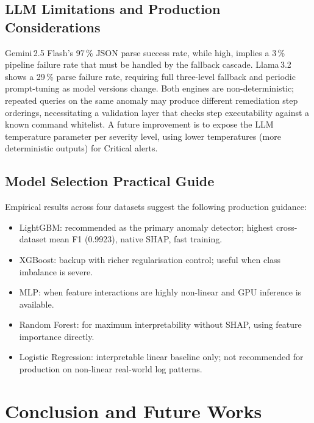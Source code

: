 \documentclass[5p, times]{elsarticle}
\begin{document}
\subsection{LLM Limitations and Production Considerations}
Gemini\,2.5 Flash's 97\,\% JSON parse success rate, while high, implies a 3\,\% pipeline failure rate that must be handled by the fallback cascade. Llama\,3.2 shows a 29\,\% parse failure rate,
requiring full three-level fallback and periodic prompt-tuning as model versions change. Both engines are non-deterministic; repeated queries on the same anomaly may produce different remediation step
orderings, necessitating a validation layer that checks step executability against a known command whitelist. A future improvement is to expose the LLM temperature parameter per severity level, using lower temperatures (more deterministic outputs) for
Critical alerts.

\subsection{Model Selection Practical Guide}
Empirical results across four datasets suggest the following production guidance:
\begin{itemize}[leftmargin=*, topsep=2pt, itemsep=1pt]
    \item LightGBM: recommended as the primary anomaly detector; highest cross-dataset mean F1 (0.9923), native SHAP,
    fast training.
    \item XGBoost: backup with richer regularisation
    control; useful when class imbalance is severe.
    \item MLP: when feature interactions are highly
    non-linear and GPU inference is available.
    \item Random Forest: for maximum interpretability
    without SHAP, using feature importance directly.
    \item Logistic Regression: interpretable linear
    baseline only; not recommended for production on non-linear real-world log patterns.
\end{itemize}

\section{Conclusion and Future Works}\label{sec10}
\end{document}
